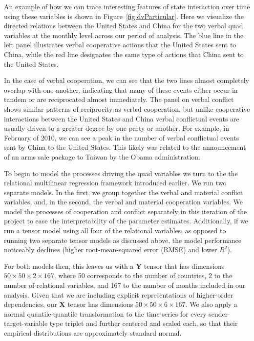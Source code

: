 \documentclass[3p,times,twocolumn,authoryear,12pt]{elsarticle}
\newcommand{\bl}[1]{{\mathbf #1}}
\begin{document}
An example of how we can trace interesting features of state interaction over time using these variables is shown in Figure~\ref{fig:dvParticular}. Here we visualize the directed relations between the United States and China for the two verbal quad variables at the monthly level across our period of analysis. The blue line in the left panel illustrates verbal cooperative actions that the United States sent to China, while the red line designates the same type of actions that China sent to the United States. 

In the case of verbal cooperation, we can see that the two lines almost completely overlap with one another, indicating that many of these events either occur in tandem or are reciprocated almost immediately. The panel on verbal conflict shows similar patterns of reciprocity as verbal cooperation, but unlike cooperative interactions between the United States and China verbal conflictual events are usually driven to a greater degree by one party or another. For example, in February of 2010, we can see a peak in the number of verbal conflictual events sent by China to the United States. This likely was related to the announcement of an arms sale package to Taiwan by the Obama administration. 

To begin to model the processes driving the quad variables we turn to the the relational multilinear regression framework introduced earlier. We run two separate models. In the first, we group together the verbal and material conflict variables, and, in the second, the verbal and material cooperation variables. We model the processes of cooperation and conflict separately in this iteration of the project to ease the interpretability of the parameter estimates. Additionally, if we run a tensor model using all four of the relational variables, as opposed to running two separate tensor models as discussed above, the model performance noticeably declines (higher root-mean-squared error (RMSE) and lower $R^2$). 

For both models then, this leaves us with a $\bl Y$ tensor that has dimensions $50 \times 50 \times 2 \times 167$, where 50 corresponds to the number of countries, 2 to the number of relational variables, and 167 to the number of months included in our analysis. Given that we are including explicit representations of higher-order dependencies, our $\bl X$ tensor has dimensions $50 \times 50 \times 6 \times 167$. We also apply a normal quantile-quantile transformation to the time-series for every sender-target-variable type triplet and further centered and scaled each, so that their empirical distributions are approximately standard normal. 
\end{document}
